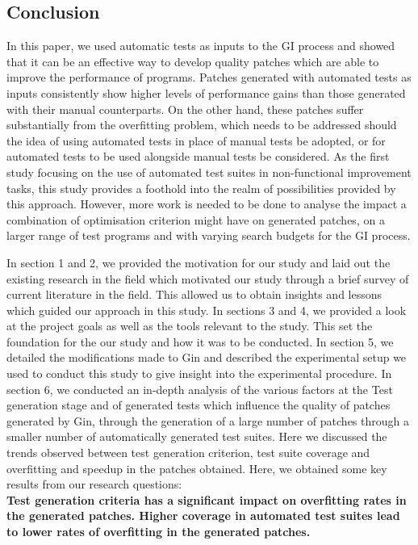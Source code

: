 \documentclass[titlepage]{article}
\begin{document}
\subsection{Conclusion}

In this paper, we used automatic tests as inputs to the GI process and showed that it can be an effective way to develop quality patches which are able to improve the performance of programs. Patches generated with automated tests as inputs consistently show higher levels of performance gains than those generated with their manual counterparts. On the other hand, these patches suffer substantially from the overfitting problem, which needs to be addressed should the idea of using automated tests in place of manual tests be adopted, or for automated tests to be used alongside manual tests be considered. As the first study focusing on the use of automated test suites in non-functional improvement tasks, this study provides a foothold into the realm of possibilities provided by this approach. However, more work is needed to be done to analyse the impact a combination of optimisation criterion might have on generated patches, on a larger range of test programs and with varying search budgets for the GI process.

In section 1 and 2, we provided the motivation for our study and laid out the existing research in the field which motivated our study through a brief survey of current literature in the field. This allowed us to obtain insights and lessons which guided our approach in this study.
In sections 3 and 4, we provided a look at the project goals as well as the tools relevant to the study. This set the foundation for the our study and how it was to be conducted.
In section 5, we detailed the modifications made to Gin and described the experimental setup we used to conduct this study to give insight into the experimental procedure. 
In section 6, we conducted an in-depth analysis of the various factors at the Test generation stage and of generated tests which influence the quality of patches generated by Gin, through the generation of a large number of patches through a smaller number of automatically generated test suites. Here we discussed the trends observed between test generation criterion, test suite coverage and overfitting and speedup in the patches obtained.
Here, we obtained some key results from our research questions: \\

\textbf{Test generation criteria has a significant impact on overfitting rates in the generated patches. Higher coverage in automated test suites lead to lower rates of overfitting in the generated patches.} 
	
\end{document}

